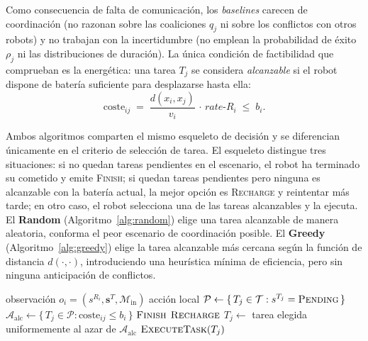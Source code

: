 Como consecuencia de falta de comunicación, los \textit{baselines} carecen de coordinación (no razonan sobre las coaliciones $q_j$ ni sobre los conflictos con otros robots) y no trabajan con la incertidumbre (no emplean la probabilidad de éxito $\rho_j$ ni las distribuciones de duración). La única condición de factibilidad que comprueban es la energética: una tarea $T_j$ se considera \emph{alcanzable} si el robot dispone de batería suficiente para desplazarse hasta ella:
\begin{equation} \label{eq:alcanzable}
    \mathrm{coste}_{ij} \;=\; \frac{d(x_i, x_j)}{v_i}\,\cdot\,\textit{rate-}R_i \;\le\; b_i .
\end{equation}

Ambos algoritmos comparten el mismo esqueleto de decisión y se diferencian únicamente en el criterio de selección de tarea. El esqueleto distingue tres situaciones: si no quedan tareas pendientes en el escenario, el robot ha terminado su cometido y emite \textsc{Finish}; si quedan tareas pendientes pero ninguna es alcanzable con la batería actual, la mejor opción es \textsc{Recharge} y reintentar más tarde; en otro caso, el robot selecciona una de las tareas alcanzables y la ejecuta. El \textbf{Random} (Algoritmo~\ref{alg:random}) elige una tarea alcanzable de manera aleatoria, conforma el peor escenario de coordinación posible. El \textbf{Greedy} (Algoritmo~\ref{alg:greedy}) elige la tarea alcanzable más cercana según la función de distancia $d(\cdot,\cdot)$, introduciendo una heurística mínima de eficiencia, pero sin ninguna anticipación de conflictos.

\begin{algorithm}
\caption{\textsc{Random} --- decisión de $R_i$ en un instante de decisión}
\label{alg:random}
\begin{algorithmic}[1]
\Require observación $o_i=(s^{R_i},\mathbf{s}^{T},\mathcal{M}_{\mathrm{in}})$
\Ensure acción local
\State $\mathcal{P} \gets \{\,T_j \in \mathcal{T} : s^{T_j}=\textsc{Pending}\,\}$ 
\State $\mathcal{A}_{\mathrm{alc}} \gets \{\,T_j \in \mathcal{P} : \mathrm{coste}_{ij}\le b_i\,\}$ 
 \Return $\textsc{Finish}$
 \Return $\textsc{Recharge}$
\Else
    \State $T_j \gets$ tarea elegida uniformemente al azar de $\mathcal{A}_{\mathrm{alc}}$
    \State \Return $\textsc{ExecuteTask}(T_j)$
\EndIf
\end{algorithmic}
\end{algorithm}

